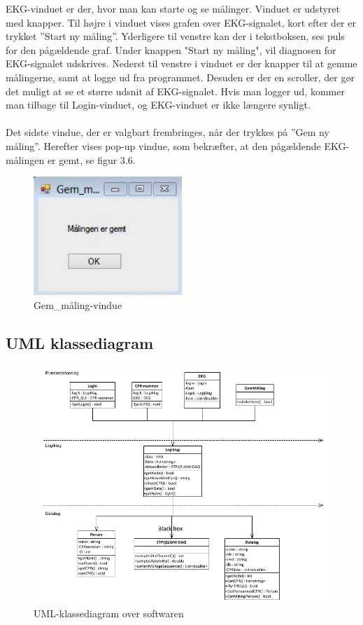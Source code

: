 EKG-vinduet er der, hvor man kan starte og se målinger. Vinduet er udstyret med knapper. Til højre i vinduet vises grafen over EKG-signalet, kort efter der er trykket ”Start ny måling”. Yderligere til venstre kan der i tekstboksen, ses puls for den pågældende graf. Under knappen "Start ny måling", vil diagnosen for EKG-signalet udskrives. Nederst til venstre i vinduet er der knapper til at gemme målingerne, samt at logge ud fra programmet. Desuden er der en scroller, der gør det muligt at se et større udsnit af EKG-signalet. Hvis man logger ud, kommer man tilbage til Login-vinduet, og EKG-vinduet er ikke længere synligt. 
\\
\\
Det sidste vindue, der er valgbart frembringes, når der trykkes på ”Gem ny måling”. Herefter vises pop-up vindue, som bekræfter, at den pågældende EKG-målingen er gemt, se figur 3.6. 

\begin{figure}[H]
	\centering
	\includegraphics[width=0.5\textwidth]{Figurer/Snip20150430_41}
	\caption{Gem\_måling-vindue}
\end{figure}

\subsection{UML klassediagram}

\begin{figure}[H]
	\centering
	\includegraphics[width=1\textwidth]{Figurer/Snip20150512_9}
	\caption{UML-klassediagram over softwaren}
\end{figure}

